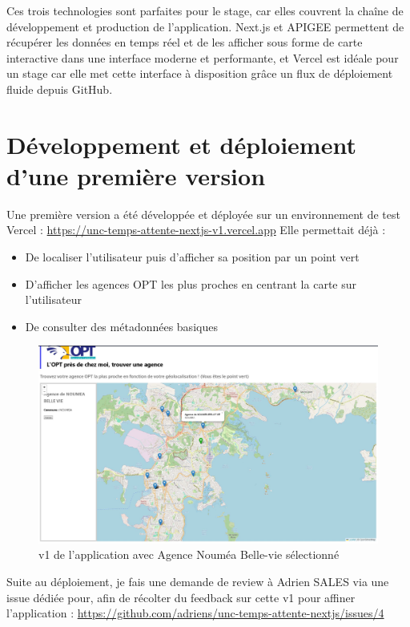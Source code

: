 \documentclass[12pt,a4paper]{report}
\begin{document}
\vspace{0.5cm}
Ces trois technologies sont parfaites pour le stage, car elles couvrent la chaîne de développement et production de l'application. Next.js et APIGEE permettent de récupérer les données en temps réel et de les afficher sous forme de carte interactive dans une interface moderne et performante, et Vercel est idéale pour un stage car elle met cette interface à disposition grâce un flux de déploiement fluide depuis GitHub.

\newpage

\section{Développement et déploiement d'une première version}
Une première version a été développée et déployée sur un environnement de test Vercel : \href{https://unc-temps-attente-nextjs-v1.vercel.app}{https://unc-temps-attente-nextjs-v1.vercel.app}
Elle permettait déjà :
\begin{itemize}
    \item De localiser l’utilisateur puis d'afficher sa position par un point vert
    \item D’afficher les agences OPT les plus proches en centrant la carte sur l'utilisateur
    \item De consulter des métadonnées basiques
\end{itemize}

\begin{figure}[h] %
    \centering
    \includegraphics[width=1\textwidth]{ressources_rapport/app_opt_v1.JPG}
    \caption{v1 de l'application avec Agence Nouméa Belle-vie sélectionné}
\end{figure}
\vspace{1cm}
Suite au déploiement, je fais une demande de review  à Adrien SALES via une issue dédiée pour, afin de récolter du feedback sur cette v1 pour affiner l'application : \href{https://github.com/adriens/unc-temps-attente-nextjs/issues/4}{https://github.com/adriens/unc-temps-attente-nextjs/issues/4}
\end{document}
